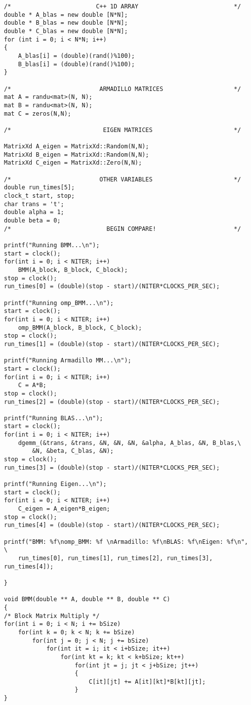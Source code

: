 \begin{center}
\begin{lstlisting}
/*                        C++ 1D ARRAY                           */
double * A_blas = new double [N*N];
double * B_blas = new double [N*N];
double * C_blas = new double [N*N];
for (int i = 0; i < N*N; i++)
{
	A_blas[i] = (double)(rand()%100);
	B_blas[i] = (double)(rand()%100);
}

/*                         ARMADILLO MATRICES                    */
mat A = randu<mat>(N, N);
mat B = randu<mat>(N, N);
mat C = zeros(N,N);

/*                          EIGEN MATRICES                       */

MatrixXd A_eigen = MatrixXd::Random(N,N);
MatrixXd B_eigen = MatrixXd::Random(N,N);
MatrixXd C_eigen = MatrixXd::Zero(N,N);

/*                         OTHER VARIABLES                       */
double run_times[5];
clock_t start, stop;
char trans = 't';
double alpha = 1;
double beta = 0;
/*                           BEGIN COMPARE!                      */

printf("Running BMM...\n");
start = clock();
for(int i = 0; i < NITER; i++)
	BMM(A_block, B_block, C_block);
stop = clock();
run_times[0] = (double)(stop - start)/(NITER*CLOCKS_PER_SEC);

printf("Running omp_BMM...\n");
start = clock();
for(int i = 0; i < NITER; i++)
	omp_BMM(A_block, B_block, C_block);
stop = clock();
run_times[1] = (double)(stop - start)/(NITER*CLOCKS_PER_SEC);

printf("Running Armadillo MM...\n");
start = clock();
for(int i = 0; i < NITER; i++)
	C = A*B;
stop = clock();
run_times[2] = (double)(stop - start)/(NITER*CLOCKS_PER_SEC);

printf("Running BLAS...\n");
start = clock();
for(int i = 0; i < NITER; i++)
	dgemm_(&trans, &trans, &N, &N, &N, &alpha, A_blas, &N, B_blas,\
		&N, &beta, C_blas, &N);
stop = clock();
run_times[3] = (double)(stop - start)/(NITER*CLOCKS_PER_SEC);

printf("Running Eigen...\n");
start = clock();
for(int i = 0; i < NITER; i++)
	C_eigen = A_eigen*B_eigen;
stop = clock();
run_times[4] = (double)(stop - start)/(NITER*CLOCKS_PER_SEC);
	
printf("BMM: %f\nomp_BMM: %f \nArmadillo: %f\nBLAS: %f\nEigen: %f\n", \
	run_times[0], run_times[1], run_times[2], run_times[3], run_times[4]);

}

void BMM(double ** A, double ** B, double ** C)
{
/* Block Matrix Multiply */
for(int i = 0; i < N; i += bSize)
	for(int k = 0; k < N; k += bSize)
		for(int j = 0; j < N; j += bSize)
			for(int it = i; it < i+bSize; it++)
				for(int kt = k; kt < k+bSize; kt++)
					for(int jt = j; jt < j+bSize; jt++)
					{
						C[it][jt] += A[it][kt]*B[kt][jt];
					}
}



\end{lstlisting}
\end{center}
